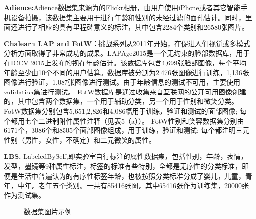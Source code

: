 \textbf{Adience:}\cite{ADIENCE}Adience数据集来源为的Flickr相册，由用户使用iPhone或者其它智能手机设备拍摄，该数据集主要用于进行年龄和性别的未经过滤的面孔估计。同时，里面还进行了相应的具有里程碑意义的标注，其中包含2284个类别和26580张图片。

\textbf{Chalearn LAP and FotW：}\cite{CHALEARN}挑战系列从2011年开始，在促进人们视觉或多模式分析方面取得了非常成功的成果。LAPAge2015是一个无约束的脸部数据库，用于在ICCV 2015上发布的视在年龄估计。该数据库包含4,699张脸部图像，每个平均年龄至少由10个不同的用户估算。数据库被分割为2,476张图像进行训练，1,136张图像进行验证，1,087张图像进行测试。由于年龄信息的测试不可用，主要使用validation集进行测试。 FotW数据库是通过收集来自互联网的公开可用图像创建的，其中包含两个数据集，一个用于辅助分类，另一个用于性别和微笑分类。 FotW数据集分别包含5,651,2,826和4,086幅用于训练，验证和测试的面部图像; 每个都用七个二进制附件属性注释（见表5（a））。 FotW性别和笑容数据集分别由6171个，3086个和8505个面部图像组成，用于训练，验证和测试; 每个都注明三元性别（男性，女性，不确定）和二元微笑的属性。

\textbf{LBS:} 
LabeledBySelf,即实验室自行标注的属性数据集，包括性别，年龄，表情，发型，墨镜等9种属性标注，标签的标准有些特别，全都是无序性的分类标准，即便是生活中普遍认为的有序性标签年龄，也被按照分类标准分成了婴儿，儿童，青年，中年，老年五个类别。一共有85416张图，其中65416张作为训练集，20000张作为测试集。

\begin{figure}[!ht]
 \centering 
	\caption{数据集图片示例}
\end{figure}

